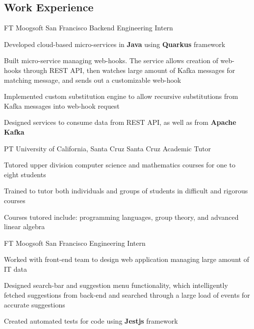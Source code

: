 \documentclass[10pt]{article}
\begin{document}
\begin{paracol}{2} %


\section{Work Experience}


{FT}
{Moogsoft}
{San Francisco}
{Backend Engineering Intern}
{}
{
\item Developed cloud-based micro-services in \textbf{Java} using \textbf{Quarkus} framework
\item Built micro-service managing web-hooks. The service allows creation of web-hooks through REST API, then watches large amount of Kafka messages for matching message, and sends out a customizable web-hook
\item Implemented custom substitution engine to allow recursive substitutions from Kafka messages into web-hook request
\item Designed services to consume data from REST API, as well as from \textbf{Apache Kafka}
}

{PT}
{University of California, Santa Cruz}
{Santa Cruz}
{Academic Tutor}
{}
{
\item Tutored upper division computer science and mathematics courses for one to eight students
\item Trained to tutor both individuals and groups of students in difficult and rigorous courses
\item Courses tutored include: programming languages, group theory, and advanced linear algebra
}

{FT}
{Moogsoft}
{San Francisco}
{Engineering Intern}
{}
{
\item Worked with front-end team to design web application managing large amount of IT data
\item Designed search-bar and suggestion menu functionality, which intelligently fetched suggestions from back-end and searched through a large load of events for accurate suggestions
\item Created automated tests for code using \textbf{Jestjs} framework
}


\end{paracol}
\end{document}

